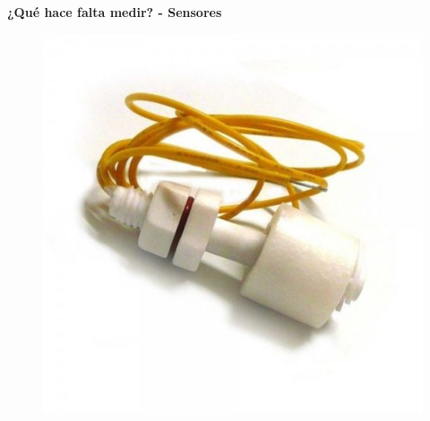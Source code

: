 \documentclass{beamer}
\begin{document}
\begin{frame}{\textbf{¿Qué hace falta medir? - Sensores}}
\begin{minipage}[c]{1.0\linewidth}
\begin{minipage}[c]{0.35\linewidth}
\begin{figure}[H]
		{\includegraphics[width=1\textwidth]{./imagenes/sensor_nivel}}	
	\end{figure}	  	  	
  \end{minipage}
\end{minipage}
\end{frame}
	
\end{document}
